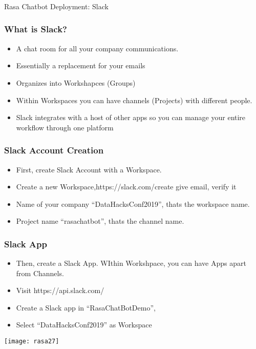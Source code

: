 \begin{frame}[fragile]\frametitle{}
\begin{center}
{\Large Rasa Chatbot Deployment: Slack}

\end{center}
\end{frame}

\begin{frame}[fragile]\frametitle{What is Slack?}
\begin{itemize}
\item A chat room for all your company communications.
\item Essentially a replacement for your emails
\item Organizes into Workshapces (Groups)
\item Within Workspaces you can have channels (Projects) with different people.
\item Slack integrates with a host of other apps so you can manage your entire workflow through one platform
\end{itemize}

\end{frame}

\begin{frame}[fragile]\frametitle{Slack Account Creation}
\begin{itemize}
\item First, create Slack Account with a Workspace.
\item Create a new Workspace,https://slack.com/create give email, verify it
\item Name of your company ``DataHacksConf2019'', thats the workspace name.
\item Project name ``rasachatbot'', thats the channel name.
\end{itemize}

\end{frame}

\begin{frame}[fragile]\frametitle{Slack App}
\begin{itemize}
\item Then, create a Slack App. WIthin Workshpace, you can have Apps apart from Channels.
\item Visit https://api.slack.com/
\item Create a Slack app in ``RasaChatBotDemo'', 
\item Select ``DataHacksConf2019'' as Workspace
\end{itemize}

\begin{center}
\texttt{[image: rasa27]}
\end{center}
\end{frame}

